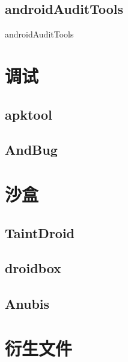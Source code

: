 \subsection{androidAuditTools}
androidAuditTools\cite{url:androidaudittools}

\section{调试}
\label{Sec:debug}
\subsection{apktool}
\subsection{AndBug}

\section{沙盒}
\subsection{TaintDroid}
\subsection{droidbox}
\subsection{Anubis}

\section{衍生文件}
